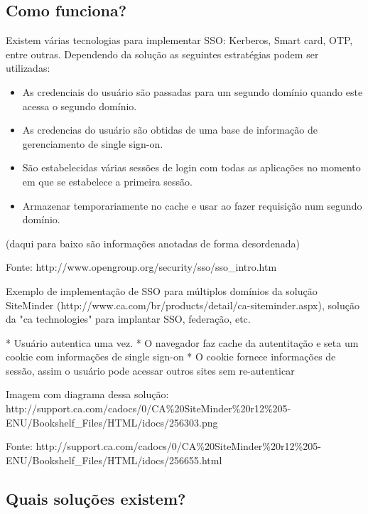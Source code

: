 \documentclass[11pt]{article}
\begin{document}

\subsection{Como funciona?}

Existem várias tecnologias para implementar SSO: Kerberos, Smart card, OTP,
entre outras. Dependendo da solução as seguintes estratégias podem ser
utilizadas:

\begin{itemize}
  \item{As credenciais do usuário são passadas para um segundo domínio
        quando este acessa o segundo domínio.}
  \item{As credencias do usuário são obtidas de uma base de informação de
        gerenciamento de single sign-on.}
  \item{São estabelecidas várias sessões de login com todas as aplicações no
        momento em que se estabelece a primeira sessão.}
  \item{Armazenar temporariamente no cache e usar ao fazer requisição num
        segundo domínio.}
\end{itemize}

(daqui para baixo são informações anotadas de forma desordenada)

Fonte: http://www.opengroup.org/security/sso/sso\_intro.htm

Exemplo de implementação de SSO para múltiplos domínios da solução SiteMinder (http://www.ca.com/br/products/detail/ca-siteminder.aspx),
solução da "ca technologies" para implantar SSO, federação, etc.

* Usuário autentica uma vez.
* O navegador faz cache da autentitação e seta um cookie com informações de single sign-on
* O cookie fornece informações de sessão, assim o usuário pode acessar outros sites sem re-autenticar

Imagem com diagrama dessa solução:
http://support.ca.com/cadocs/0/CA\%20SiteMinder\%20r12\%205-ENU/Bookshelf\_Files/HTML/idocs/256303.png

Fonte:
http://support.ca.com/cadocs/0/CA\%20SiteMinder\%20r12\%205-ENU/Bookshelf\_Files/HTML/idocs/256655.html

\subsection{Quais soluções existem?}
\end{document}
